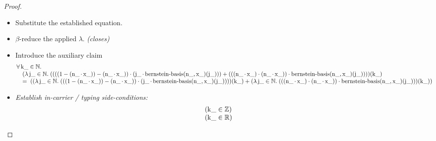 \documentclass[11pt]{article}
\theoremstyle{plain}
\begin{document}
\begin{proof}
\begin{itemize}[leftmargin=2.8em, itemsep=4pt, parsep=1pt]
  \item[\textbf{87}] Substitute the established equation.
  \item[\textbf{88--89}] $\beta$-reduce the applied $\lambda$.  \emph{(closes)}
  \item[\textbf{90}] Introduce the auxiliary claim
\begin{equation*}
\begin{array}{@{}l@{}} \forall \operatorname{k\_} \in \mathbb{N}. \\ \quad (\lambda \operatorname{j\_} \in \mathbb{N}.\; ((((1 - (\operatorname{n\_} \cdot \operatorname{x\_})) - (\operatorname{n\_} \cdot \operatorname{x\_})) \cdot (\operatorname{j\_} \cdot \operatorname{bernstein\text{-}basis}(\operatorname{n\_}, \operatorname{x\_})(\operatorname{j\_}))) + (((\operatorname{n\_} \cdot \operatorname{x\_}) \cdot (\operatorname{n\_} \cdot \operatorname{x\_})) \cdot \operatorname{bernstein\text{-}basis}(\operatorname{n\_}, \operatorname{x\_})(\operatorname{j\_}))))(\operatorname{k\_}) \\ \quad =\; ((\lambda \operatorname{j\_} \in \mathbb{N}.\; (((1 - (\operatorname{n\_} \cdot \operatorname{x\_})) - (\operatorname{n\_} \cdot \operatorname{x\_})) \cdot (\operatorname{j\_} \cdot \operatorname{bernstein\text{-}basis}(\operatorname{n\_}, \operatorname{x\_})(\operatorname{j\_}))))(\operatorname{k\_}) + (\lambda \operatorname{j\_} \in \mathbb{N}.\; (((\operatorname{n\_} \cdot \operatorname{x\_}) \cdot (\operatorname{n\_} \cdot \operatorname{x\_})) \cdot \operatorname{bernstein\text{-}basis}(\operatorname{n\_}, \operatorname{x\_})(\operatorname{j\_})))(\operatorname{k\_})) \end{array}
\end{equation*}

  \item[\textbf{91--93}] \emph{Establish in-carrier / typing side-conditions:}
\begin{equation*}
\begin{array}{@{}l@{}}
(\operatorname{k\_} \in \mathbb{Z}) \\
(\operatorname{k\_} \in \mathbb{R})
\end{array}
\end{equation*}


\end{itemize}
\end{proof}
\end{document}
